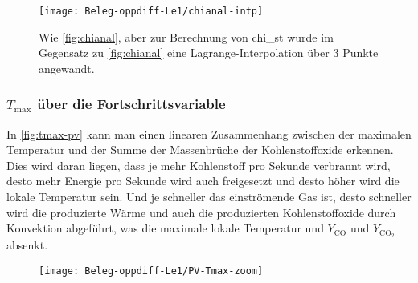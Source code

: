 \begin{figure}[H]\begin{center}
    \begin{minipage}{0.49\linewidth}\begin{center}
        \texttt{[image: Beleg-oppdiff-Le1/chianal-intp]}
    \end{center}\end{minipage}
    \caption{Wie \autoref{fig:chianal}, aber zur Berechnung von \gls{chi_st} wurde im Gegensatz zu \autoref{fig:chianal} eine Lagrange-Interpolation über 3 Punkte angewandt.}
    \label{fig:chianal-intp}
\end{center}\end{figure}


\subsubsection{\texorpdfstring{$T_\mathrm{max}$}{Tmax} über die Fortschrittsvariable}

In \autoref{fig:tmax-pv} kann man einen linearen Zusammenhang zwischen der maximalen Temperatur und der Summe der Massenbrüche der Kohlenstoffoxide erkennen. Dies wird daran liegen, dass je mehr Kohlenstoff pro Sekunde verbrannt wird, desto mehr Energie pro Sekunde wird auch freigesetzt und desto höher wird die lokale Temperatur sein. Und je schneller das einströmende Gas ist, desto schneller wird die produzierte Wärme und auch die produzierten Kohlenstoffoxide durch Konvektion abgeführt, was die maximale lokale Temperatur und $Y_\mathrm{CO}$ und $Y_{\mathrm{CO}_2}$ absenkt.

\begin{figure}[H]
	\captionsetup{type=figure}
    \begin{center}\begin{minipage}{0.49\linewidth}
        \texttt{[image: Beleg-oppdiff-Le1/PV-Tmax-zoom]}
    \end{minipage}\end{center}
    \label{fig:tmax-pv}
\end{figure}


